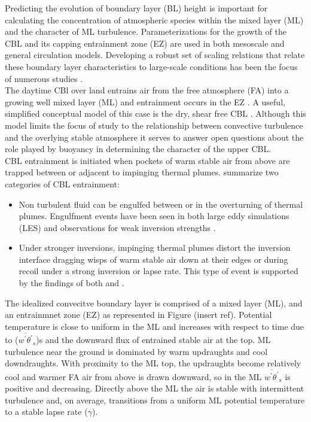 \documentclass[referee]{svjour3}
\begin{document}
Predicting the evolution of boundary layer (BL) height is important for calculating the concentration of atmospheric species within the mixed layer (ML) and the character of ML turbulence.  Parameterizations for the growth of the  CBL and its capping entrainment zone (EZ) are used in both mesoscale and general circulation models.  Developing a robust set of scaling relations that relate these boundary layer characteristics to large-scale conditions has been the focus of numerous studies
 \citep[e.g.][]{Stull-BLMetIntro, Traum11, SteynBaldHoff, StullNelEl, Sorbjan1}.\\

The daytime CBl over land entrains air from the free atmosphere (FA) into a growing well mixed layer (ML) and entrainment occurs in the EZ \citep{DearWill80}. A useful, simplified conceptual model of this case is the dry, shear free CBL \citep{Sullivan98, Fedorovich04, Brooks12}. Although this model limits the focus of study to the relationship between convective turbulence and the overlying stable atmosphere it serves to answer open questions about the role played by buoyancy in determining the character of the upper CBL.\\  

CBL entrainment is initiated when pockets of warm stable air from above are trapped between or adjacent to impinging thermal plumes.  \citep{Traum11} summarize two categories of CBL entrainment:\\

\begin{itemize}

\item{Non turbulent fluid can be engulfed between or in the overturning of thermal plumes. Engulfment events have been seen in both   large eddy simulations (LES) and observations for weak inversion strengths \citep{Sullivan98,Traum11}.}  

\item{
Under stronger inversions, impinging thermal plumes distort the inversion interface dragging wisps of warm stable air down at their edges or during recoil under a strong inversion or lapse rate. This type of event is supported by the findings  of both \cite{Sullivan98} and \cite{Traum11}.}

\end{itemize}


The idealized convecitve boundary layer is comprised of a mixed layer (ML), and an entrainmnet zone (EZ) as represented in Figure (insert ref).  Potential temperature is close to uniform in the ML and increases with respect to time due to ($\overline{w^{'}\theta^{'}}_{s}$)s and the downward flux of entrained stable air at the top. ML turbulence near the ground is dominated by warm updraughts and cool downdraughts. With proximity to the ML top, the updraughts become relatively cool and warmer FA air from above is drawn downward, so in the ML $\overline{w^{'}\theta^{'}}_{s}$  is positive and decreasing. Directly above the ML the air is stable with intermittent turbulence and, on average, transitions from a uniform ML potential temperature to a stable lapse rate ($\gamma$).
\end{document}
